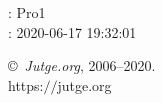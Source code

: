 \documentclass[11pt]{article}
\begin{document}
    \newcommand{\SampleTwoCol}{\SampleTwoColInputOutput{sample-000}{1}\SampleTwoColInputOutput{sample-001}{2}\SampleTwoColInputOutput{sample-002}{3}\SampleTwoColInputOutput{sample-003}{4}\SampleTwoColInputOutput{sample-013}{5}}
    \newcommand{\SampleOneCol}{\SampleOneColInputOutput{sample-000}{1}\SampleOneColInputOutput{sample-001}{2}\SampleOneColInputOutput{sample-002}{3}\SampleOneColInputOutput{sample-003}{4}\SampleOneColInputOutput{sample-013}{5}}

    \ProblemInformation
    \Author: Pro1\\    
    \Generation: 2020-06-17 19:32:01

    \bigskip

    \copyright\ \emph{Jutge.org}, 2006--2020. \\
    https:$/\!\!/$jutge.org
\end{document}
